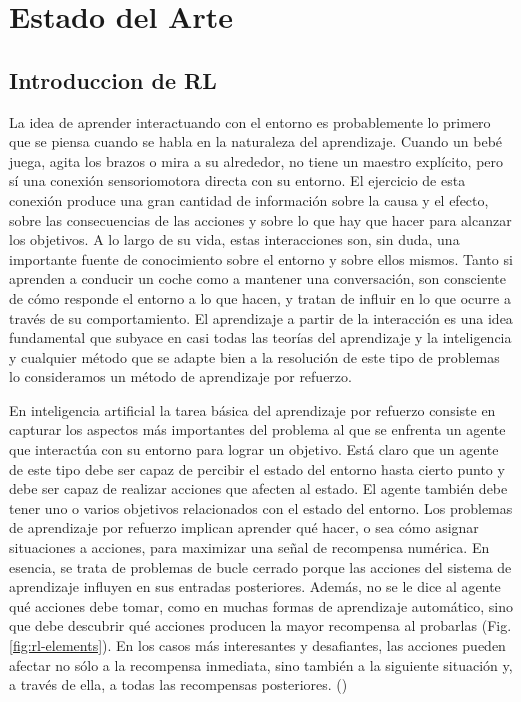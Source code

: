 \chapter{Estado del Arte}\label{chapter:state-of-the-art}

\section{Introduccion de RL}\label{section:state-of-the-art:introduction-to-RL}

La idea de aprender interactuando con el entorno es probablemente lo primero que se piensa cuando se habla en la naturaleza del aprendizaje. Cuando un bebé juega, agita los brazos o mira a su alrededor, no tiene un maestro explícito, pero sí una conexión sensoriomotora directa con su entorno. El ejercicio de esta conexión produce una gran cantidad de información sobre la causa y el efecto, sobre las consecuencias de las acciones y sobre lo que hay que hacer para alcanzar los objetivos. A lo largo de su vida, estas interacciones son, sin duda, una importante fuente de conocimiento sobre el entorno y sobre ellos mismos. Tanto si aprenden a conducir un coche como a mantener una conversación, son consciente de cómo responde el entorno a lo que hacen, y tratan de influir en lo que ocurre a través de su comportamiento. El aprendizaje a partir de la interacción es una idea fundamental que subyace en casi todas las teorías del aprendizaje y la inteligencia y cualquier método que se adapte bien a la resolución de este tipo de problemas lo consideramos un método de aprendizaje por refuerzo.

En inteligencia artificial la tarea básica del aprendizaje por refuerzo consiste en capturar los aspectos más importantes del problema al que se enfrenta un agente que interactúa con su entorno para lograr un objetivo. Está claro que un agente de este tipo debe ser capaz de percibir el estado del entorno hasta cierto punto y debe ser capaz de realizar acciones que afecten al estado. El agente también debe tener uno o varios objetivos relacionados con el estado del entorno. Los problemas de aprendizaje por refuerzo implican aprender qué hacer, o sea cómo asignar situaciones a acciones, para maximizar una señal de recompensa numérica. En esencia, se trata de problemas de bucle cerrado porque las acciones del sistema de aprendizaje influyen en sus entradas posteriores. Además, no se le dice al agente qué acciones debe tomar, como en muchas formas de aprendizaje automático, sino que debe descubrir qué acciones producen la mayor recompensa al probarlas (Fig. \ref{fig:rl-elements}). En los casos más interesantes y desafiantes, las acciones pueden afectar no sólo a la recompensa inmediata, sino también a la siguiente situación y, a través de ella, a todas las recompensas posteriores. (\cite{sutton1998introduction})

